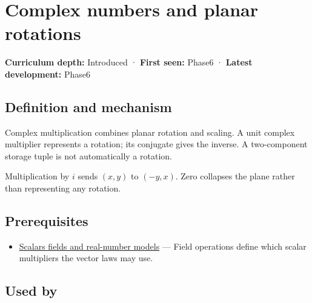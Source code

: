 \hypertarget{appendix-f77eadcc4a93}{}\label{referencestart:appendix-f77eadcc4a93}
\section{Complex numbers and planar rotations}\label{appendix-f77eadcc4a93-complex-numbers-and-planar-rotations}

\hypertarget{appendix-f77eadcc4a93-complex-numbers-and-planar-rotations}{}

\textbf{Curriculum depth:} Introduced · \textbf{First seen:} Phase6 · \textbf{Latest development:} Phase6

\begin{allmightroledefinition}

\subsection{Definition and mechanism}\label{appendix-f77eadcc4a93-definition-and-mechanism}

\hypertarget{appendix-f77eadcc4a93-definition-and-mechanism}{}

Complex multiplication combines planar rotation and scaling. A unit complex multiplier represents a rotation; its conjugate gives the inverse. A two-component storage tuple is not automatically a rotation.

\end{allmightroledefinition}

Multiplication by \(i\) sends \((x,y)\) to \((-y,x)\). Zero collapses the plane rather than representing any rotation.

\subsection{Prerequisites}\label{appendix-f77eadcc4a93-prerequisites}

\hypertarget{appendix-f77eadcc4a93-prerequisites}{}

\begin{itemize}
\tightlist
\item
  \hyperref[appendix-52051ad550fe]{Scalars fields and real-number models} --- Field operations define which scalar multipliers the vector laws may use.
\end{itemize}

\subsection{Used by}\label{appendix-f77eadcc4a93-used-by}

